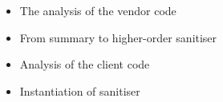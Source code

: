 \begin{itemize}
\item The analysis of the vendor code

\item From summary to higher-order sanitiser

\item Analysis of the client code

\item Instantiation of sanitiser

\end{itemize}
